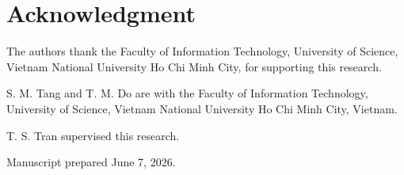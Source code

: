 \section*{Acknowledgment}
The authors thank the Faculty of Information Technology, University of Science, Vietnam National University Ho Chi Minh City, for supporting this research.

\medskip
\begingroup
\footnotesize
\noindent S. M. Tang and T. M. Do are with the Faculty of Information Technology, University of Science, Vietnam National University Ho Chi Minh City, Vietnam.
\par\noindent T. S. Tran supervised this research.
\par\noindent Manuscript prepared June 7, 2026.
\endgroup

